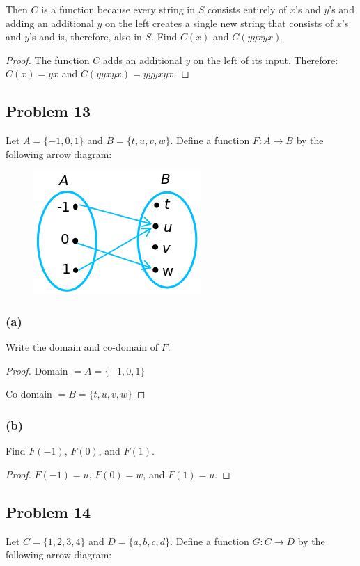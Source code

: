 \documentclass[14pt]{extarticle}
\begin{document}
Then $C$ is a function because every string in $S$ consists entirely of $x$’s
and $y$’s and adding an additional $y$ on the left creates a single new string
that consists of $x$’s and $y$’s and is, therefore, also in $S$.
Find $C(x)$ and $C(yyxyx)$.

\begin{proof}
The function $C$ adds an additional $y$ on the left of its input. Therefore:
$C(x) = yx$ and $C(yyxyx) = yyyxyx$.
\end{proof}

\subsection{Problem 13}
Let $A = \{-1, 0, 1\}$ and $B = \{t, u, v, w\}$. Define a function $F: A \to B$
by the following arrow diagram:

\begin{figure}[ht!]
\centering
\includegraphics[scale=0.5]{../images/1.3.13.png}
\end{figure}

\subsubsection{(a)}
Write the domain and co-domain of $F$.

\begin{proof}
Domain $ = A = \{-1, 0, 1\}$

Co-domain $ = B = \{t, u, v, w\}$
\end{proof}

\subsubsection{(b)}
Find $F(-1)$, $F(0)$, and $F(1)$.

\begin{proof}
$F(-1) = u$, $F(0) = w$, and $F(1)= u$.
\end{proof}

\subsection{Problem 14}
Let $C = \{1, 2, 3, 4\}$ and $D = \{a, b, c, d\}$. Define a function
$G: C \to D$ by the following arrow diagram:
\end{document}

